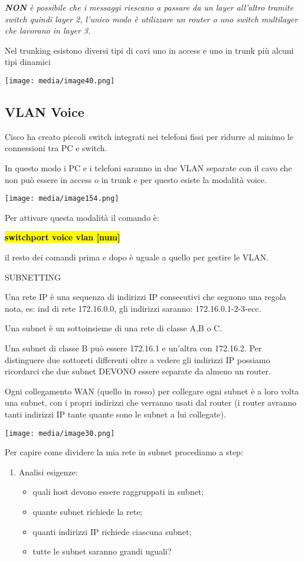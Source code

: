 \emph{\textbf{NON} è possibile che i messaggi riescano a passare da un
layer all'altro tramite switch quindi layer 2, l'unico modo è utilizzare
un router o uno switch multilayer che lavorano in layer 3.}

Nel trunking esistono diversi tipi di cavi uno in access e uno in trunk
più alcuni tipi dinamici

\texttt{[image: media/image40.png]}

\subsection{VLAN Voice}\label{vlan-voice}

Cisco ha creato piccoli switch integrati nei telefoni fissi per ridurre
al minimo le connessioni tra PC e switch.

In questo modo i PC e i telefoni saranno in due VLAN separate con il
cavo che non può essere in access o in trunk e per questo esiste la
modalità voice.

\texttt{[image: media/image154.png]}

Per attivare questa modalità il comando è:

\textbf{\hl{switchport voice vlan {[}num{]}}}

il resto dei comandi prima e dopo è uguale a quello per gestire le VLAN.

SUBNETTING

Una rete IP è una sequenza di indirizzi IP consecutivi che seguono una
regola nota, es: ind di rete 172.16.0.0, gli indirizzi saranno:
172.16.0.1-2-3-ecc.

Una subnet è un sottoinsieme di una rete di classe A,B o C.

Una subnet di classe B può essere 172.16.1 e un'altra con 172.16.2. Per
distinguere due sottoreti differenti oltre a vedere gli indirizzi IP
possiamo ricordarci che due subnet DEVONO essere separate da almeno un
router.

Ogni collegamento WAN (quello in rosso) per collegare ogni subnet è a
loro volta una subnet, con i propri indirizzi che verranno usati dal
router (i router avranno tanti indirizzi IP tante quante sono le subnet
a lui collegate).

\texttt{[image: media/image30.png]}

Per capire come dividere la mia rete in subnet procediamo a step:

\begin{enumerate}
\def\labelenumi{\arabic{enumi}.}
\item
  Analisi esigenze:

  \begin{itemize}
  \item
    quali host devono essere raggruppati in subnet;
  \item
    quante subnet richiede la rete;
  \item
    quanti indirizzi IP richiede ciascuna subnet;
  \item
    tutte le subnet saranno grandi uguali?
  \end{itemize}
\end{enumerate}

